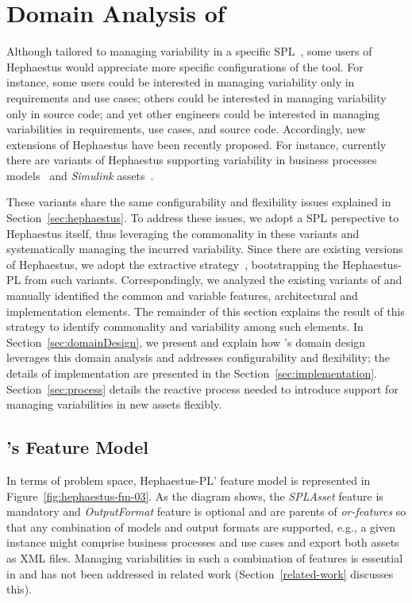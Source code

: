 \section{Domain Analysis of \hpl}
\label{sec:domainAnalysis}

Although tailored to managing variability in a specific SPL~\cite{ferreira:2010}, some users of Hephaestus
would appreciate more specific configurations of the
tool. For instance, some users could be interested in managing
variability only in requirements and use cases; others could be
interested in managing variability only in source code; and yet other
engineers could be interested in managing variabilities in
requirements, use cases, and source code.
Accordingly, new extensions of Hephaestus have been recently proposed. For
instance, currently there are variants of Hephaestus supporting variability in business
processes models~\cite{Machado:2011:MVB:1960502.1960508} and \emph{Simulink} assets~\cite{simulink}.

These variants share the same configurability and flexibility issues explained in Section~\ref{sec:hephaestus}. To address these issues, we adopt a SPL perspective to Hephaestus itself, thus leveraging the commonality in these variants and systematically managing the incurred variability. Since there are existing versions of Hephaestus, we adopt the extractive strategy~\cite{kruegerPFE01}, bootstrapping the Hephaestus-PL from such variants. Correspondingly, we  analyzed the existing variants of \hp{} and manually identified the common and variable features, architectural and implementation elements. The remainder of this section explains the result of this strategy to identify commonality and variability among such elements. In Section~\ref{sec:domainDesign}, we present and explain how \hpl's domain design leverages this domain analysis and addresses configurability and flexibility; the details of implementation are presented in the Section~\ref{sec:implementation}. Section~\ref{sec:process} details the reactive process needed to introduce support for managing variabilities in new assets flexibly.

\subsection{\hpl's Feature Model} \label{feature-model-hpl}

In terms of problem space, Hephaestus-PL' feature model is represented in Figure~\ref{fig:hephaestus-fm-03}. As
the diagram shows, the \emph{SPLAsset} feature is mandatory and \emph{OutputFormat} feature is optional and are
parents of \emph{or-features} so that any combination of models and output formats are
supported, e.g., a given instance might comprise business processes and use cases and export both
assets as XML files. Managing variabilities in such a combination of features is essential in \hpl{} and
has not been addressed in related work (Section~\ref{related-work} discusses this).

